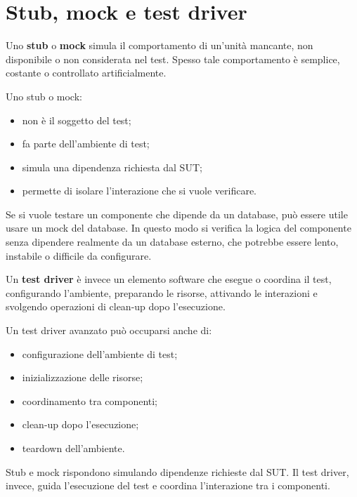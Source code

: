 \section{Stub, mock e test driver}

Uno \textbf{stub} o \textbf{mock} simula il comportamento di un'unità mancante, non disponibile o non considerata nel test. Spesso tale comportamento è semplice, costante o controllato artificialmente.

Uno stub o mock:

\begin{itemize}
    \item non è il soggetto del test;
    \item fa parte dell'ambiente di test;
    \item simula una dipendenza richiesta dal SUT;
    \item permette di isolare l'interazione che si vuole verificare.
\end{itemize}

\begin{notaprof}
Se si vuole testare un componente che dipende da un database, può essere utile usare un mock del database. In questo modo si verifica la logica del componente senza dipendere realmente da un database esterno, che potrebbe essere lento, instabile o difficile da configurare.
\end{notaprof}

Un \textbf{test driver} è invece un elemento software che esegue o coordina il test, configurando l'ambiente, preparando le risorse, attivando le interazioni e svolgendo operazioni di clean-up dopo l'esecuzione.

Un test driver avanzato può occuparsi anche di:

\begin{itemize}
    \item configurazione dell'ambiente di test;
    \item inizializzazione delle risorse;
    \item coordinamento tra componenti;
    \item clean-up dopo l'esecuzione;
    \item teardown dell'ambiente.
\end{itemize}

\begin{notaesame}
Stub e mock rispondono simulando dipendenze richieste dal SUT. Il test driver, invece, guida l'esecuzione del test e coordina l'interazione tra i componenti.
\end{notaesame}

